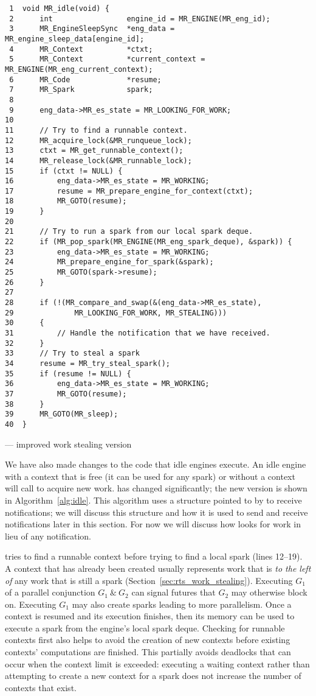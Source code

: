 \begin{algorithm}[tbp]
\begin{verbatim}
 1  void MR_idle(void) {
 2      int                 engine_id = MR_ENGINE(MR_eng_id);
 3      MR_EngineSleepSync  *eng_data = MR_engine_sleep_data[engine_id];
 4      MR_Context          *ctxt;
 5      MR_Context          *current_context = MR_ENGINE(MR_eng_current_context);
 6      MR_Code             *resume;
 7      MR_Spark            spark;
 8
 9      eng_data->MR_es_state = MR_LOOKING_FOR_WORK;
10
11      // Try to find a runnable context.
12      MR_acquire_lock(&MR_runqueue_lock);
13      ctxt = MR_get_runnable_context();
14      MR_release_lock(&MR_runnable_lock);
15      if (ctxt != NULL) {
16          eng_data->MR_es_state = MR_WORKING;
17          resume = MR_prepare_engine_for_context(ctxt);
18          MR_GOTO(resume);
19      }
20
21      // Try to run a spark from our local spark deque.
22      if (MR_pop_spark(MR_ENGINE(MR_eng_spark_deque), &spark)) {
23          eng_data->MR_es_state = MR_WORKING;
24          MR_prepare_engine_for_spark(&spark);
25          MR_GOTO(spark->resume);
26      }
27
28      if (!(MR_compare_and_swap(&(eng_data->MR_es_state),
29              MR_LOOKING_FOR_WORK, MR_STEALING)))
30      {
31          // Handle the notification that we have received.
32      }
33      // Try to steal a spark
34      resume = MR_try_steal_spark();
35      if (resume != NULL) {
36          eng_data->MR_es_state = MR_WORKING;
37          MR_GOTO(resume);
38      }
39      MR_GOTO(MR_sleep);
40  }
\end{verbatim}
\caption{\idle --- improved work stealing version}
\label{alg:idle}
\end{algorithm}

We have also made changes to the code that idle engines execute.
An idle engine with a context that is free (it can be used for any spark) or
without a context will call \idle to acquire new work.
\idle has changed significantly;
the new version is shown in Algorithm~\ref{alg:idle}.
This algorithm uses a structure pointed to by  to receive
notifications;
we will discuss this structure and how it is used to send and receive
notifications later in this section.
For now we will discuss how \idle looks for work in lieu of any notification.

\idle tries to find a runnable context before trying to find a local
spark (lines 12--19).
A context that has already been created usually represents work that is
\emph{to the left of}
any work that is still a spark (Section~\ref{sec:rts_work_stealing}).
Executing $G_1$ of a parallel conjunction $G_1~\&~G_2$ can signal futures
that $G_2$ may otherwise block on.
Executing $G_1$ may also create sparks leading to more parallelism.
Once a context is resumed and its execution finishes,
then its memory can be used to execute a spark from the engine's local spark
deque.
Checking for runnable contexts first also helps to avoid the creation of new
contexts before existing contexts' computations are finished.
This partially avoids deadlocks that can occur when the context limit is
exceeded:
executing a waiting context rather than attempting to create a new context
for a spark does not increase the number of contexts that exist.

